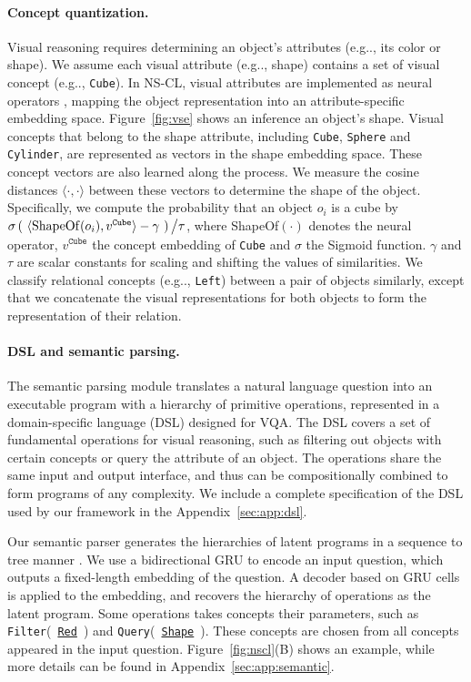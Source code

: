 \documentclass{article} \usepackage{iclr2019_conference,times}
\makeatletter
\newcommand{\sigmoid}{\sigma}
\newcommand{\fig}[1]{Figure~\ref{#1}}
\DeclareRobustCommand\onedot{\futurelet\@let@token\@onedot}
\def\@onedot{\ifx\@let@token.\else.\null\fi\xspace}
\def\eg{e.g\onedot} \def\Eg{E.g\onedot}
\newcommand{\model}{NS-CL\xspace}
\newcommand{\myparagraph}[1]{\vspace{-3pt}\paragraph{#1}}
\makeatother
\begin{document}
\myparagraph{Concept quantization.}
Visual reasoning requires determining an object's attributes (\eg, its color or shape). We assume each visual attribute (\eg, shape) contains a set of visual concept (\eg, \texttt{Cube}). In \model, visual attributes are implemented as neural operators
, mapping the object representation into an attribute-specific embedding space. \fig{fig:vse} shows an inference an object's shape. Visual concepts that belong to the shape attribute, including \texttt{Cube}, \texttt{Sphere} and \texttt{Cylinder}, are represented as vectors in the shape embedding space. These concept vectors are also learned along the process. We measure the cosine distances $\langle \cdot , \cdot \rangle$ between these vectors to determine the shape of the object. Specifically, we compute the probability that an object $o_i$ is a cube by
$\sigmoid \left({~\langle \mathrm{\small ShapeOf}(o_i), v^{\texttt{Cube}} \rangle - \gamma}~\right) \big/ \tau$,
where ShapeOf$(\cdot)$ denotes the neural operator, $v^{\texttt{Cube}}$ the concept embedding of \texttt{Cube} and $\sigmoid$ the Sigmoid function. $\gamma$ and $\tau$ are scalar constants for scaling and shifting the values of similarities. We classify relational concepts (\eg, \texttt{Left}) between a pair of objects similarly, except that we concatenate the visual representations for both objects to form the representation of their relation.

\myparagraph{DSL and semantic parsing.}

The semantic parsing module translates a natural language question into an executable program with a hierarchy of primitive operations, represented in a domain-specific language (DSL) designed for VQA. The DSL covers a set of fundamental operations for visual reasoning, such as filtering out objects with certain concepts or query the attribute of an object. The operations share the same input and output interface, and thus can be compositionally combined to form programs of any complexity. We include a complete specification of the DSL used by our framework in the Appendix~\ref{sec:app:dsl}.

Our semantic parser generates the hierarchies of latent programs in a sequence to tree manner \citep{Dong2016Language}. We use a bidirectional GRU \citep{Cho2014Learning} to encode an input question, which outputs a fixed-length embedding of the question. A decoder based on GRU cells is applied to the embedding, and recovers the hierarchy of operations as the latent program. Some operations takes concepts their parameters, such as \texttt{Filter}(~\underline{\texttt{Red}}~) and \texttt{Query}(~\underline{\texttt{Shape}}~). These concepts are chosen from all concepts appeared in the input question. \fig{fig:nscl}(B) shows an example, while more details can be found in Appendix~\ref{sec:app:semantic}.
\end{document}
